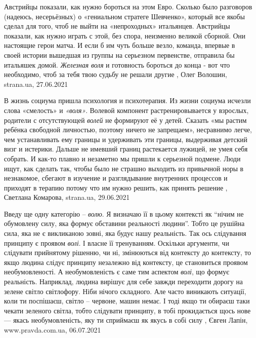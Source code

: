 Австрийцы показали, как нужно бороться на этом Евро.  Сколько было разговоров
(надеюсь, несерьёзных) о «гениальном стратеге Шевченко», который все якобы
сделал для того, чтоб не выйти на «непроходных» итальянцев. Австрийцы показали,
как нужно играть с этой, без спора, неизменно великой сборной.  Они настоящие
герои матча. И если б им чуть больше везло, команда, впервые в своей истории
вышедшая из группы на серьезном первенстве, отправила бы итальяшек домой.
\emph{Железная воля} и готовность бороться до конца - вот что необходимо, чтоб за тебя
твою судьбу не решали другие
, 
Олег Волошин, strana.ua, 27.06.2021

В жизнь социума пришла психология и психотерапия. Из жизни социума исчезли
слова «смелость» и \emph{«воля»}. Волевой компонент растренировывается у взрослых,
родители с отсутствующей \emph{волей} не формируют её у детей. Сказать «мы растим
ребёнка свободной личностью, поэтому ничего не запрещаем», несравнимо легче,
чем устанавливать ему границы и удерживать эти границы, выдерживая детский визг
и истерики. Дальше не имевший границ растекается лужицей, не умея себя собрать.
И как-то плавно и незаметно мы пришли к серьезной подмене. Люди ищут, как
сделать так, чтобы было не страшно выходить из привычной норы в незнакомое,
сбегают в изучение и разглядывание внутренних процессов и приходят в терапию
потому что им нужно решить, как принять решение
, 
Светлана Комарова, strana.ua, 29.06.2021


Введу ще одну категорію – \emph{волю}. Я визначаю її в цьому контексті як \enquote{нічим не
обумовлену силу, яка формує обставини реальності людини}. Тобто це рушійна
сила, яка не є викликаною зовні, яка будує нашу реальність.  Так ось слідування
принципу є проявом \emph{волі}. І власне її тренуванням.  Оскільки аргументи, чи
слідувати прийнятому рішенню, чи ні, змінюються від контексту до контексту, то
якщо людина слідує принципу незалежно від контексту, це становиться проявом
необумовленості. А необумовленість є саме тим аспектом \emph{волі}, що формує
реальність.  Наприклад, людина вирішує для себе завжди переходити дорогу на
зелене світло світлофору. Ніби нічого складного. Але часто виникають ситуації,
коли ти поспішаєш, світло – червоне, машин немає. І тоді якщо ти обираєш таки
чекати зеленого світла, тобто слідувати принципу, в тобі прокидається щось нове
— якась необумовленість, яку ти сприймаєш як якусь в собі силу
, 
Євген Лапін, www.pravda.com.ua, 06.07.2021

